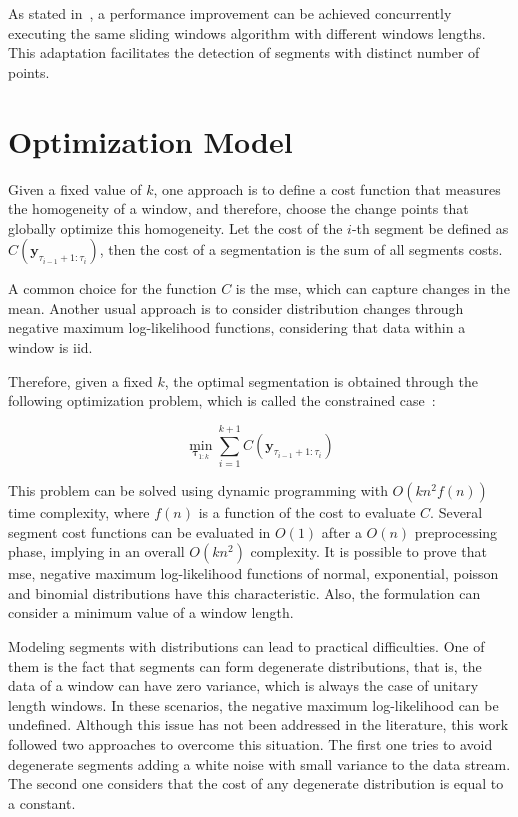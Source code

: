 As stated in~\cite{detecting_change_in_data_streams}, a performance improvement
can be achieved concurrently executing the same sliding windows algorithm with
different windows lengths. This adaptation facilitates the detection of
segments with distinct number of points.

\section{Optimization Model}

Given a fixed value of $k$, one approach is to define a cost function that
measures the homogeneity of a window, and therefore, choose the change points
that globally optimize this homogeneity. Let the cost of the $i$-th segment be
defined as $C(\mathbf{y}_{\tau_{i - 1} + 1 : \tau_{i}})$, then the cost of a
segmentation is the sum of all segments costs.

A common choice for the function $C$ is the \gls*{mse}, which can
capture changes in the mean. Another usual approach is to consider distribution
changes through negative maximum log-likelihood functions, considering that data
within a window is iid.

Therefore, given a fixed $k$, the optimal segmentation is obtained through the
following optimization problem, which is called the constrained
case~\cite{on_optimal_multiple_changepoint_algorithms_for_large_data}:

\begin{equation}
    \min_{\boldsymbol \tau_{1 : k}} \sum \limits_{i = 1}^{k + 1} C(\mathbf{y}_{\tau_{i - 1} + 1 : \tau_{i}})
\end{equation}

This problem can be solved using dynamic programming with $O(k n^2 f(n))$ time
complexity, where $f(n)$ is a function of the cost to evaluate $C$. Several
segment cost functions can be evaluated in $O(1)$ after a $O(n)$ preprocessing
phase, implying in an overall $O(k n^2)$ complexity. It is possible to prove
that \gls*{mse}, negative maximum log-likelihood functions of normal, exponential,
poisson and binomial distributions have this characteristic. Also, the
formulation can consider a minimum value of a window length.

Modeling segments with distributions can lead to practical difficulties. One of
them is the fact that segments can form degenerate distributions, that is, the
data of a window can have zero variance, which is always the case of unitary
length windows. In these scenarios, the negative maximum log-likelihood can be
undefined. Although this issue has not been addressed in the literature,
this work followed two approaches to overcome this situation. The first one
tries to avoid degenerate segments adding a white noise with small variance to
the data stream. The second one considers that the cost of any degenerate
distribution is equal to a constant.

